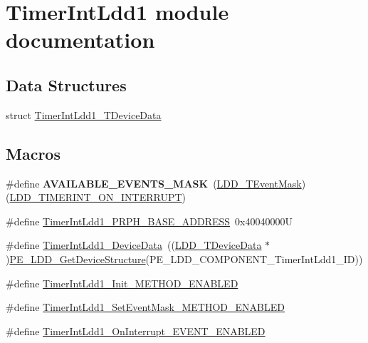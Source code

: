 \hypertarget{group___timer_int_ldd1__module}{}\section{Timer\+Int\+Ldd1 module documentation}
\label{group___timer_int_ldd1__module}
\subsection*{Data Structures}
\begin{DoxyCompactItemize}
\item 
struct \hyperlink{struct_timer_int_ldd1___t_device_data}{Timer\+Int\+Ldd1\+\_\+\+T\+Device\+Data}
\end{DoxyCompactItemize}
\subsection*{Macros}
\begin{DoxyCompactItemize}
\item 
\mbox{\label{group___timer_int_ldd1__module_ga5f04a8830cd52a3ffa1678d113f31aee}} 
\#define {\bfseries A\+V\+A\+I\+L\+A\+B\+L\+E\+\_\+\+E\+V\+E\+N\+T\+S\+\_\+\+M\+A\+SK}~(\hyperlink{group___p_e___types__module_gafbe7f4d4e51560399c3bdd0218584533}{L\+D\+D\+\_\+\+T\+Event\+Mask})(\hyperlink{group___p_e___types__module_gad4a95a8e3f3036e88f99c792431b4d72}{L\+D\+D\+\_\+\+T\+I\+M\+E\+R\+I\+N\+T\+\_\+\+O\+N\+\_\+\+I\+N\+T\+E\+R\+R\+U\+PT})
\item 
\#define \hyperlink{group___timer_int_ldd1__module_gafb6b69926d7c31c7571ad3d945251067}{Timer\+Int\+Ldd1\+\_\+\+P\+R\+P\+H\+\_\+\+B\+A\+S\+E\+\_\+\+A\+D\+D\+R\+E\+SS}~0x40040000U
\item 
\#define \hyperlink{group___timer_int_ldd1__module_ga5029b1a3ee62b1e77252cb5ee432e572}{Timer\+Int\+Ldd1\+\_\+\+Device\+Data}~((\hyperlink{group___p_e___types__module_gac5cf1362f1f0e3a2ce71b1bf2276d091}{L\+D\+D\+\_\+\+T\+Device\+Data} $\ast$)\hyperlink{group___p_e___types__module_gaa1c23d559daef5bcd3327ca83fb56f5a}{P\+E\+\_\+\+L\+D\+D\+\_\+\+Get\+Device\+Structure}(P\+E\+\_\+\+L\+D\+D\+\_\+\+C\+O\+M\+P\+O\+N\+E\+N\+T\+\_\+\+Timer\+Int\+Ldd1\+\_\+\+ID))
\item 
\#define \hyperlink{group___timer_int_ldd1__module_ga99f1a84b931818260bb4dfad5d071136}{Timer\+Int\+Ldd1\+\_\+\+Init\+\_\+\+M\+E\+T\+H\+O\+D\+\_\+\+E\+N\+A\+B\+L\+ED}
\item 
\#define \hyperlink{group___timer_int_ldd1__module_ga9a101199dc9561903b1d0645c761fd2e}{Timer\+Int\+Ldd1\+\_\+\+Set\+Event\+Mask\+\_\+\+M\+E\+T\+H\+O\+D\+\_\+\+E\+N\+A\+B\+L\+ED}
\item 
\#define \hyperlink{group___timer_int_ldd1__module_ga97ee83f24ca8c5f570d5be8bdc0c6dde}{Timer\+Int\+Ldd1\+\_\+\+On\+Interrupt\+\_\+\+E\+V\+E\+N\+T\+\_\+\+E\+N\+A\+B\+L\+ED}
\end{DoxyCompactItemize}
